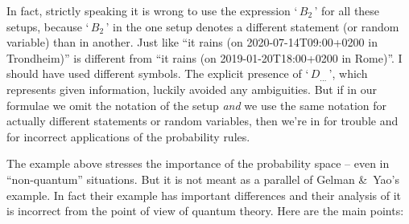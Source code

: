 \documentclass[\ifafour a4paper,12pt,\else a5paper,10pt,\fi%
onecolumn,oneside,article,%
british%
]{memoir}
\newcommand*{\defquote}[1]{`\,#1\,'}
\theoremstyle{remark}
\theoremstyle{innote}
\newcommand*{\citey}{\parencites*}
\newcommand*{\amp}{\&}
\renewcommand*{\|}[1][]{\nonscript\,#1\vert\nonscript\;\mathopen{}}
\newcommand*{\sect}{\S}%
\begin{document}
In fact, strictly speaking it is wrong to use the expression
\defquote{$B_{2}$} for all these setups, because \defquote{$B_{2}$} in the
one setup denotes a different statement (or random variable) than in
another. Just like \enquote{it rains (on 2020-07-14T09:00+0200 in
  Trondheim)} is different from \enquote{it rains (on 2019-01-20T18:00+0200
  in Rome)}. I should have used different symbols. The explicit presence of
\defquote{$D_{\dotso}$}, which represents given information, luckily
avoided any ambiguities. But if in our formulae we omit the notation of the
setup \emph{and} we use the same notation for actually different statements
or random variables, then we're in for trouble and for incorrect
applications of the probability rules.

\medskip

The example above stresses the importance of the probability space -- even
in \enquote{non-quantum} situations. But it is not meant as a parallel of
Gelman \amp\ Yao's \citey[\sect~2]{gelmanetal2020} example. In fact their
example has important differences and their analysis of it is incorrect
from the point of view of quantum theory. Here are the main points:
\end{document}
